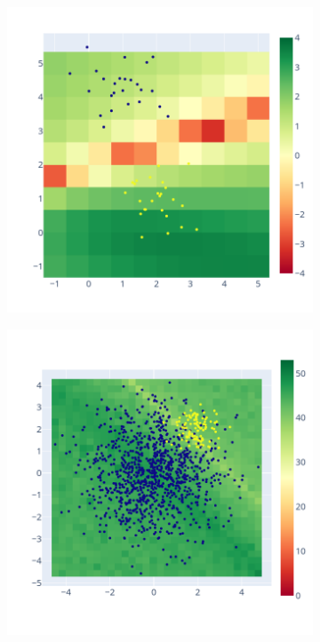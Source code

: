 \documentclass[11pt]{article}
\begin{document}
\begin{figure}
\begin{subfigure}{.3\linewidth}
    \caption{}
    \label{fig:weighted_nw_sig}
    \end{subfigure}
    \begin{subfigure}{.3\linewidth}
    \includegraphics[width=\linewidth]{figure/separating_hyperplan/hyperplan_zoom.png}
    \caption{}
    \label{fig:hyperplan_sig_zoom}
    \end{subfigure}
    \begin{subfigure}{.3\linewidth}
    \includegraphics[width=\linewidth]{figure/SVM/weighted.png}

\end{subfigure}
\end{figure}
\end{document}
